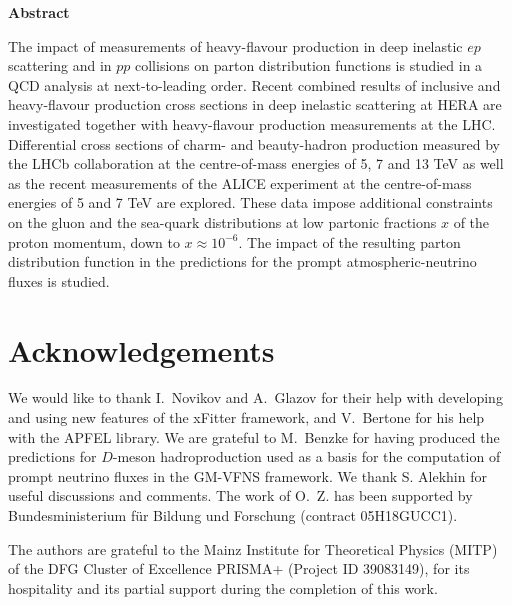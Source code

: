 \documentclass[12pt]{article}
\begin{document}
\begin{titlepage}
  \vspace{1.0cm}
\begin{center}
\large
{\bf Abstract}
\vspace{-0.2cm}
\end{center}
The impact of measurements of heavy-flavour production in deep inelastic $ep$ scattering and
in $pp$ collisions on parton distribution functions is studied in a QCD analysis at next-to-leading order. 
Recent combined results of inclusive and heavy-flavour production cross sections in deep inelastic scattering at HERA are 
investigated together with heavy-flavour production measurements at the LHC. Differential cross sections of charm- and 
beauty-hadron production measured by the LHCb collaboration at the centre-of-mass energies of 5, 7 and 13 TeV as well 
as the recent measurements of the ALICE experiment at the centre-of-mass energies of 5 and 7 TeV are explored. 
These data impose additional constraints on the gluon and the sea-quark distributions at low partonic fractions
$x$ of the proton momentum, down to $x\approx10^{-6}$. The impact of the resulting parton distribution function in the predictions for the prompt atmospheric-neutrino fluxes is studied.


\vfill
\end{titlepage}


%
%
\newpage




\section*{Acknowledgements}

We would like to thank I.~Novikov and A.~Glazov for their help with developing and using new features of the xFitter framework, and V.~Bertone for his help with the APFEL library. We are grateful to M.~Benzke for having produced the predictions for $D$-meson hadroproduction used as a basis for the computation of prompt neutrino fluxes in the GM-VFNS framework. We thank S. Alekhin for useful discussions and comments. The work of O.~Z. has been supported by Bundesministerium f\"ur Bildung und Forschung (contract 05H18GUCC1). 

The authors are grateful to the Mainz Institute for Theoretical Physics (MITP)
of the DFG Cluster of Excellence PRISMA+ (Project ID 39083149), for its
hospitality and its partial support during the completion of this work.
\end{document}
